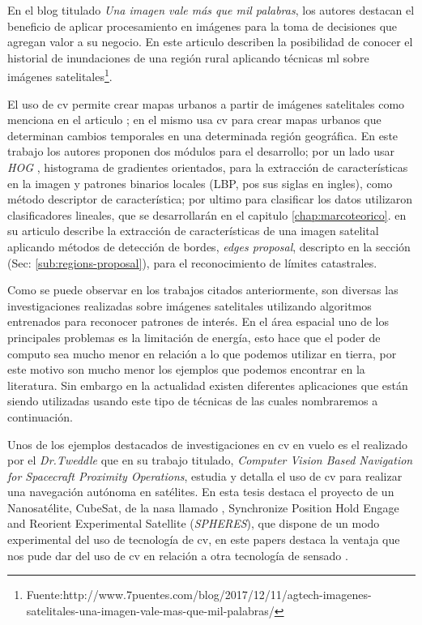 En el blog titulado \textit{Una imagen vale más que mil palabras}, los autores destacan el beneficio de aplicar procesamiento en imágenes para la toma de decisiones que agregan valor a su negocio. En este articulo describen la posibilidad de conocer el historial de inundaciones de una región rural aplicando técnicas \ac{ml} sobre imágenes satelitales\footnote{Fuente:http://www.7puentes.com/blog/2017/12/11/agtech-imagenes-satelitales-una-imagen-vale-mas-que-mil-palabras/}.

El uso de \ac{cv} permite crear mapas urbanos a partir de imágenes satelitales como menciona en el articulo \citep{detectionHOG}; en el mismo usa \ac{cv} para crear mapas urbanos que determinan cambios temporales en una determinada región geográfica. En este trabajo los autores proponen dos módulos para el desarrollo; por un lado usar \textit{HOG} , histograma de gradientes orientados,\citep{HOG_algoritmo} para la extracción de características en la imagen y patrones binarios locales (LBP, pos sus siglas en ingles)\citep{LBP}, como método descriptor de característica; por ultimo para clasificar los datos utilizaron clasificadores lineales, que se desarrollarán en el capitulo \ref{chap:marcoteorico}. \cite{usman} en su articulo describe la extracción de características de una imagen satelital aplicando métodos de  detección de bordes, \textit{edges proposal}\citep{proposal}, descripto en la sección (Sec: \ref{sub:regions-proposal}), para el reconocimiento de límites catastrales.

Como se puede observar en los trabajos citados anteriormente, son diversas las investigaciones realizadas sobre imágenes satelitales utilizando algoritmos entrenados para reconocer patrones de interés. En el área espacial uno de los principales problemas es la limitación de energía, esto hace que el poder de computo sea mucho menor en relación a lo que podemos utilizar en tierra, por este motivo son mucho menor los ejemplos que podemos encontrar en la literatura. Sin embargo en la actualidad existen diferentes aplicaciones que están siendo utilizadas usando este tipo de técnicas de las cuales nombraremos a continuación.

Unos de los ejemplos destacados de investigaciones en \ac{cv} en vuelo es el realizado por el \textit{Dr.Tweddle} que en su trabajo titulado, \textit{Computer Vision Based Navigation for Spacecraft Proximity Operations}, estudia y detalla el uso de \ac{cv} para realizar una navegación autónoma en satélites. En esta tesis destaca el proyecto de un Nanosatélite, CubeSat, de la \ac{nasa} llamado , Synchronize Position Hold Engage and Reorient Experimental Satellite (\textit{SPHERES}), que dispone de un modo experimental del uso de tecnología de \ac{cv}, en este papers destaca la ventaja que nos pude dar del uso de \ac{cv} en relación a otra tecnología de sensado \citep{Brent}.


